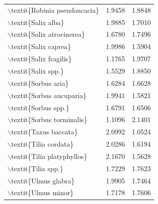 \begin{table}[ht]
\begin{tabular}{lrr}
  $\backslash$textit\{Robinia pseudoacacia\} & 1.9458 & 1.8848 \\ 
  $\backslash$textit\{Salix alba\} & 1.9885 & 1.7010 \\ 
  $\backslash$textit\{Salix atrocinerea\} & 1.6780 & 1.7496 \\ 
  $\backslash$textit\{Salix caprea\} & 1.9986 & 1.5904 \\ 
  $\backslash$textit\{Salix fragilis\} & 1.1765 & 1.9707 \\ 
  $\backslash$textit\{Salix spp.\} & 1.5529 & 1.8850 \\ 
  $\backslash$textit\{Sorbus aria\} & 1.6284 & 1.6628 \\ 
  $\backslash$textit\{Sorbus aucuparia\} & 1.9941 & 1.5821 \\ 
  $\backslash$textit\{Sorbus spp.\} & 1.6791 & 1.6506 \\ 
  $\backslash$textit\{Sorbus torminalis\} & 1.1096 & 2.1401 \\ 
  $\backslash$textit\{Taxus baccata\} & 2.0992 & 1.0524 \\ 
  $\backslash$textit\{Tilia cordata\} & 2.0286 & 1.6194 \\ 
  $\backslash$textit\{Tilia platyphyllos\} & 2.1670 & 1.5628 \\ 
  $\backslash$textit\{Tilia spp.\} & 1.7229 & 1.7623 \\ 
  $\backslash$textit\{Ulmus glabra\} & 1.9905 & 1.7464 \\ 
  $\backslash$textit\{Ulmus minor\} & 1.7178 & 1.7606 \\ 
   \hline
\end{tabular}
\end{table}
